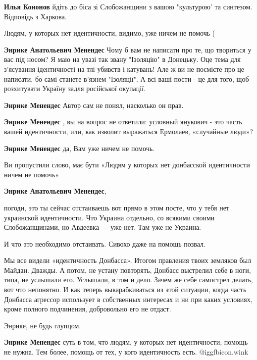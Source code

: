 \begin{itemize}
\begin{itemize}
\textbf{Илья Кононов} йдіть до біса зі Слобожанщини з вашою "культурою' та синтезом. Відповідь з Харкова.

\end{itemize} %

Людям, у которых нет идентичности, видимо, уже ничем не помочь (

\begin{itemize} %
\textbf{Энрике Анатольевич Менендес} Чому б вам не написати про те, що твориться у вас під носом? Я маю на увазі так звану "Ізоляцію" в Донецьку. Оце тема для з'ясування ідентичності на тлі убивств і катувань! Але ж ви не посмієте про це написати, бо самі станете в'язнем "Ізоляції". А всі ваші пости - це для того, щоб розхитувати Україну задля російської окупації.

\textbf{Энрике Менендес} Автор сам не понял, насколько он прав.

\textbf{Энрике Менендес} , вы на вопрос не ответили: условный янукович - это часть вашей идентичности, или, как изволит выражаться Ермолаев, «случайные люди»?

\textbf{Энрике Менендес} да, Вам уже ничем не помочь.

Ви пропустили слово, має бути «Людям у которых нет донбасской идентичности ничем не помочь»

\textbf{Энрике Анатольевич Менендес}, 

погоди, это ты сейчас отстаиваешь вот прямо в этом посте, что у тебя нет
украинской идентичности. Что Украина отдельно, со всякими своими
Слобожанщинами, но Авдеевка — уже нет. Там уже не Украина.

И что это необходимо отстаивать. Сивохо даже на помощь позвал.

Мы все видели «идентичность Донбасса». Итогом правления твоих земляков был
Майдан. Дважды. А потом, не устану повторять, Донбасс выстрелил себе в ноги,
типа, не услышали его. Услышали, в том и дело. Зачем же себе самострел делать,
вот что непонятно. И как теперь выкарабкиваться из этой ситуации, когда часть
Донбасса агрессор использует в собственных интересах и ни при каких условиях,
кроме полного подчинения, добровольно его не отдаст.

Энрике, не будь глупцом.

\textbf{Энрике Менендес} суть в том, что людям, у которых нет идентичности, помощь не нужна. Тем более, помощь от тех, у кого идентичность есть.  @igg{fbicon.wink} 


\end{itemize}
\end{itemize}
